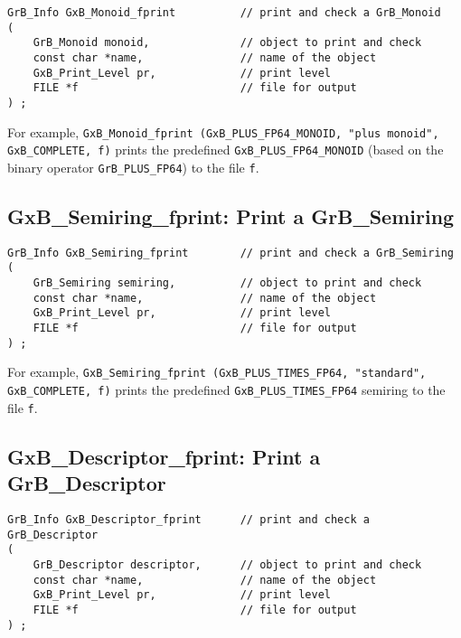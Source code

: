 \documentclass[12pt]{article}
\begin{document}
{\begin{mdframed}[userdefinedwidth=6in]
{\footnotesize
\begin{verbatim}
GrB_Info GxB_Monoid_fprint          // print and check a GrB_Monoid
(
    GrB_Monoid monoid,              // object to print and check
    const char *name,               // name of the object
    GxB_Print_Level pr,             // print level
    FILE *f                         // file for output
) ;
\end{verbatim} } \end{mdframed}

For example,
\verb'GxB_Monoid_fprint (GxB_PLUS_FP64_MONOID, "plus monoid",'
\verb'GxB_COMPLETE, f)'
prints the predefined \verb'GxB_PLUS_FP64_MONOID' (based on the binary
operator \verb'GrB_PLUS_FP64') to the file \verb'f'.

\subsection{{\sf GxB\_Semiring\_fprint:} Print a {\sf GrB\_Semiring}}

\begin{mdframed}[userdefinedwidth=6in]
{\footnotesize
\begin{verbatim}
GrB_Info GxB_Semiring_fprint        // print and check a GrB_Semiring
(
    GrB_Semiring semiring,          // object to print and check
    const char *name,               // name of the object
    GxB_Print_Level pr,             // print level
    FILE *f                         // file for output
) ;
\end{verbatim} } \end{mdframed}

For example,
\verb'GxB_Semiring_fprint (GxB_PLUS_TIMES_FP64, "standard",'
\verb'GxB_COMPLETE, f)'
prints the predefined \verb'GxB_PLUS_TIMES_FP64' semiring to the file \verb'f'.

\subsection{{\sf GxB\_Descriptor\_fprint:} Print a {\sf GrB\_Descriptor}}

\begin{mdframed}[userdefinedwidth=6in]
{\footnotesize
\begin{verbatim}
GrB_Info GxB_Descriptor_fprint      // print and check a GrB_Descriptor
(
    GrB_Descriptor descriptor,      // object to print and check
    const char *name,               // name of the object
    GxB_Print_Level pr,             // print level
    FILE *f                         // file for output
) ;
\end{verbatim} } \end{mdframed}

}
\end{document}
